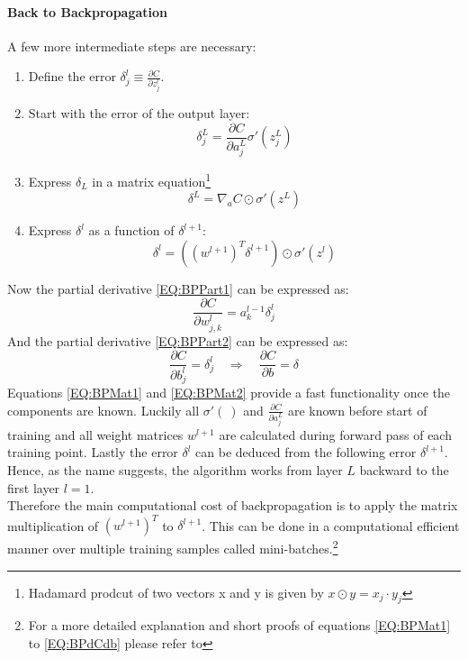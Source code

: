 			\paragraph{Back to Backpropagation}
				A few  more intermediate steps are necessary:
				\begin{enumerate}
					\item Define the error $\delta^l_j \equiv \frac{\partial C}{\partial z^l_j}$.
					\item Start with the error of the output layer: 
					\begin{equation}
						\delta^L_j = \frac{\partial C}{\partial a^L_j}\sigma'\left(z^L_j\right)
						\label{EQ:BPDel}
					\end{equation}
					\item Express $\delta_L$ in a matrix equation\footnote{Hadamard prodcut of two vectors x and y is given by $x \odot y= x_j \cdot y_j$}
					\begin{equation}
						\delta^L = \nabla_a C \odot \sigma'\left(z^L\right)
						\label{EQ:BPMat1}
					\end{equation}
					\item Express $\delta^l$ as a function of $\delta^{l+1}$:
						\begin{equation}
							\delta^l = \left(\left(w^{l+1}\right)^T \delta^{l+1}\right) \odot \sigma'\left(z^l\right)
							\label{EQ:BPMat2}
						\end{equation}
				\end{enumerate}
				Now the partial derivative \ref{EQ:BPPart1} can be expressed as:
				\begin{equation}
					\frac{\partial C}{\partial w^l_{j,k}} = a^{l-1}_k \delta^l_j
					\label{EQ:BPdCdw}
				\end{equation}
				And the partial derivative \ref{EQ:BPPart2} can be expressed as:
				\begin{equation}
					\frac{\partial C}{\partial b^l_j} = \delta^l_j \quad \Rightarrow \quad \frac{\partial C}{\partial b} = \delta
					\label{EQ:BPdCdb}
				\end{equation}
				Equations \ref{EQ:BPMat1} and \ref{EQ:BPMat2} provide a fast functionality once the components are known. Luckily all $\sigma'(\:)$ and $\frac{\partial C}{\partial a^L_j}$ are known before start of training and all weight matrices $w^{l+1}$ are calculated during forward pass of each training point. Lastly the error $\delta^l$ can be deduced from the following error $\delta^{l+1}$. Hence, as the name suggests, the algorithm works from layer $L$ backward to the first layer $l=1$.\\
				Therefore the main computational cost of backpropagation is to apply the matrix multiplication of $\left(w^{l+1}\right)^T$ to $\delta^{l+1}$. This can be done in a computational efficient manner over multiple training samples called mini-batches.\footnote{For a more detailed explanation and short proofs of equations \ref{EQ:BPMat1} to \ref{EQ:BPdCdb} please refer to }

